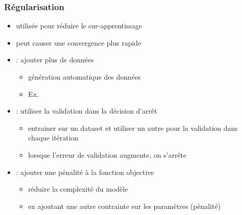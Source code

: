 \documentclass[xcolor=table]{beamer}
\begin{document}
\begin{frame}
	\frametitle{Régularisation}
	
	\begin{itemize}
		\item utilisée pour réduire le sur-apprentissage 
		\item peut causer une convergence plus rapide
		\item {} : ajouter plus de données
		\begin{itemize}
			\item génération automatique des données 
			\item Ex. 
		\end{itemize}
		\item {} : utiliser la validation dans la décision d'arrêt
		\begin{itemize}
			\item entrainer sur un dataset et utiliser un autre pour la validation dans chaque itération
			\item lorsque l'erreur de validation augmente, on s'arrête
		\end{itemize}
		\item {} : ajouter une pénalité à la fonction objective
		\begin{itemize}
			\item réduire la complexité du modèle
			\item en ajoutant une autre contrainte sur les paramètres (pénalité)
		\end{itemize}
	\end{itemize}
	
\end{frame}
\end{document}
